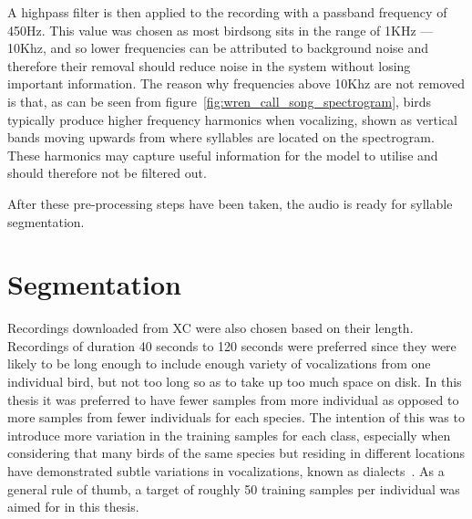 A highpass filter is then applied to the recording with a passband frequency of
450Hz. This value was chosen as most birdsong sits in the range of 1KHz ---
10Khz, and so lower frequencies can be attributed to background noise and
therefore their removal should reduce noise in the system without losing
important information. The reason why frequencies above 10Khz are not removed
is that, as can be seen from figure~\ref{fig:wren_call_song_spectrogram}, birds
typically produce higher frequency harmonics when vocalizing, shown as vertical
bands moving upwards from where syllables are located on the spectrogram. These
harmonics may capture useful information for the model to utilise
and should therefore not be filtered out.

After these pre-processing steps have been taken, the audio is ready for
syllable segmentation.

\section{Segmentation}\label{sec:segmentation}

Recordings downloaded from XC were also chosen based on their length. Recordings
of duration 40 seconds to 120 seconds were preferred since they were likely to
be long enough to include enough variety of vocalizations from one individual
bird, but not too long so as to take up too much space on disk. In this thesis
it was preferred to have fewer samples from more individual as opposed to more
samples from fewer individuals for each species. The intention of this was to
introduce more variation in the training samples for each class, especially when
considering that many birds of the same species but residing in different
locations have demonstrated subtle variations in vocalizations, known as
dialects~\cite{baker1985biology}. As a general rule of thumb, a target of
roughly 50 training samples per individual was aimed for in this thesis.

